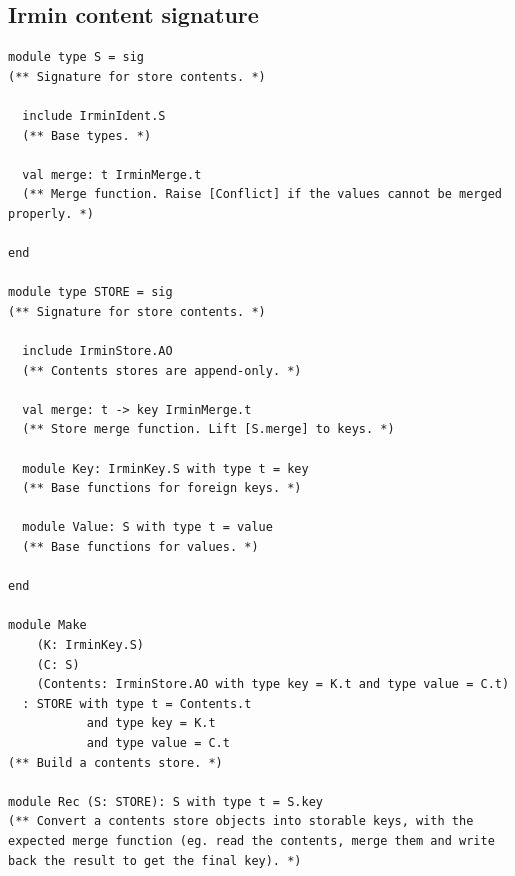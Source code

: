 \documentclass{article}
\newcommand{\irmin}{Irmin\xspace}
\begin{document}
\subsection{\irmin content signature\label{appendixcontent}}
\begin{lstlisting}
module type S = sig
(** Signature for store contents. *)

  include IrminIdent.S
  (** Base types. *)

  val merge: t IrminMerge.t
  (** Merge function. Raise [Conflict] if the values cannot be merged properly. *)

end

module type STORE = sig
(** Signature for store contents. *)

  include IrminStore.AO
  (** Contents stores are append-only. *)

  val merge: t -> key IrminMerge.t
  (** Store merge function. Lift [S.merge] to keys. *)

  module Key: IrminKey.S with type t = key
  (** Base functions for foreign keys. *)

  module Value: S with type t = value
  (** Base functions for values. *)

end

module Make
    (K: IrminKey.S)
    (C: S)
    (Contents: IrminStore.AO with type key = K.t and type value = C.t)
  : STORE with type t = Contents.t
           and type key = K.t
           and type value = C.t
(** Build a contents store. *)

module Rec (S: STORE): S with type t = S.key
(** Convert a contents store objects into storable keys, with the expected merge function (eg. read the contents, merge them and write back the result to get the final key). *)
\end{lstlisting}

\newpage
\end{document}
